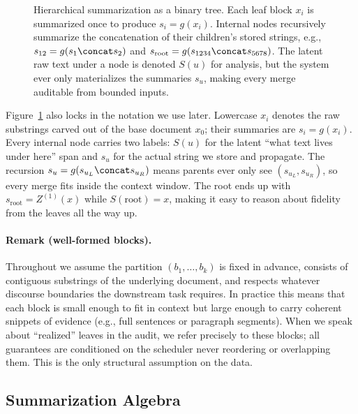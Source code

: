 \begin{figure}[t]
    \centering
    
    \caption{Hierarchical summarization as a binary tree. Each leaf block $x_i$ is summarized once to produce $s_i=g(x_i)$. Internal nodes recursively summarize the concatenation of their children's stored strings, e.g., $s_{12}=g(s_1\concat s_2)$ and $s_{\mathrm{root}}=g(s_{1234}\concat s_{5678})$. The latent raw text under a node is denoted $S(u)$ for analysis, but the system ever only materializes the summaries $s_u$, making every merge auditable from bounded inputs.}
    \label{fig:hierarchical_summarization}
\end{figure}

Figure~\ref{fig:hierarchical_summarization} also locks in the notation we use later. Lowercase $x_i$ denotes the raw substrings carved out of the base document $x_0$; their summaries are $s_i=g(x_i)$. Every internal node carries two labels: $S(u)$ for the latent ``what text lives under here'' span and $s_u$ for the actual string we store and propagate. The recursion $s_u=g(s_{u_L}\concat s_{u_R})$ means parents ever only see $(s_{u_L},s_{u_R})$, so every merge fits inside the context window. The root ends up with $s_{\mathrm{root}}=Z^{(1)}(x)$ while $S(\text{root})=x$, making it easy to reason about fidelity from the leaves all the way up.

\paragraph{Remark (well-formed blocks).}
Throughout we assume the partition $(b_1,\ldots,b_k)$ is fixed in advance, consists of contiguous substrings of the underlying document, and respects whatever discourse boundaries the downstream task requires. In practice this means that each block is small enough to fit in context but large enough to carry coherent snippets of evidence (e.g., full sentences or paragraph segments). When we speak about ``realized'' leaves in the audit, we refer precisely to these blocks; all guarantees are conditioned on the scheduler never reordering or overlapping them. This is the only structural assumption on the data.

\subsection{Summarization Algebra}

